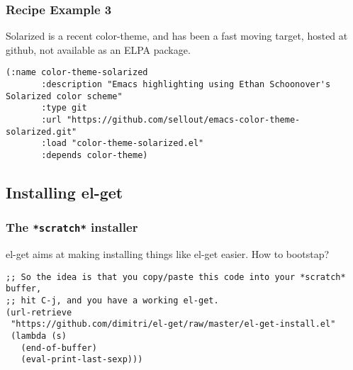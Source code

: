 \documentclass{beamer}
\begin{document}
\begin{frame}[fragile]
  \frametitle{Recipe Example 3}

  Solarized is a recent color-theme, and has been a fast moving target,
  hosted at github, not available as an ELPA package.

  \begin{verbatim}
(:name color-theme-solarized
       :description "Emacs highlighting using Ethan Schoonover's Solarized color scheme"
       :type git
       :url "https://github.com/sellout/emacs-color-theme-solarized.git"
       :load "color-theme-solarized.el"
       :depends color-theme)
  \end{verbatim}
\end{frame}



\subsection{Installing el-get}

\begin{frame}[fragile]
  \frametitle{The \texttt{*scratch*} installer}

  el-get aims at making installing things like el-get easier.  How to
  bootstap?

  \begin{verbatim}
;; So the idea is that you copy/paste this code into your *scratch* buffer,
;; hit C-j, and you have a working el-get.
(url-retrieve
 "https://github.com/dimitri/el-get/raw/master/el-get-install.el"
 (lambda (s)
   (end-of-buffer)
   (eval-print-last-sexp)))
  \end{verbatim}

\end{frame}
\end{document}
